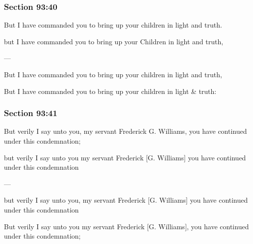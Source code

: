 	\subsubsection{Section 93:40} %
		\label{DC93-40}

		But I have commanded you to bring up your children in light and truth.

		\begin{framed}
		\scriptsize
			\begin{compactdesc}
				\item[JSP] but I have commanded you to bring up your Children in light and truth,
				\item[BC] ---
				\item[RB2] But I have commanded you to bring up your children in light and truth, 
				\item[RB1] But I have commanded you to bring up your children in light \& truth: 
			\end{compactdesc}
		\end{framed}

	\subsubsection{Section 93:41} %
		\label{DC93-41}

		But verily I say unto you, my servant Frederick G. Williams, you have continued under this condemnation;

		\begin{framed}
		\scriptsize
			\begin{compactdesc}
				\item[JSP] but verily I say unto you my servant Frederick [G. Williams] you have continued under this condemnation
				\item[BC] ---
				\item[RB2] but verily I say unto you, my servant Frederick [G. Williams] you have continued under this condemnation 
				\item[RB1] But verily I say unto you my servant Frederick [G. Williams], you have continued under this condemnation; 
			\end{compactdesc}
		\end{framed}

